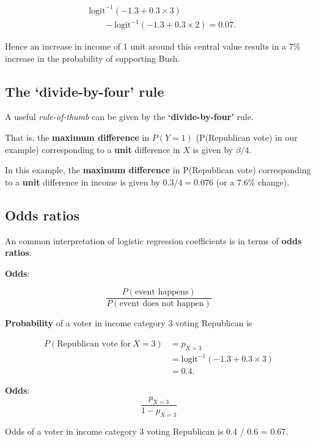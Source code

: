 \documentclass[]{book}
\theoremstyle{definition}
\theoremstyle{definition}
\theoremstyle{definition}
\theoremstyle{remark}
\begin{document}
\[
\begin{aligned}
& \mbox{logit}^{-1}\left(-1.3 + 0.3 \times 3\right) \\
&~~~~~~~~- \mbox{logit}^{-1}\left(-1.3 + 0.3 \times 2\right) = 0.07.
\end{aligned}
\]

Hence an increase in income of 1 unit around this central value results
in a 7\% increase in the probability of supporting Bush.

\subsection{\texorpdfstring{The `divide-by-four'
rule}{The divide-by-four rule}}\label{the-divide-by-four-rule}

A useful \emph{rule-of-thumb} can be given by the
\textbf{`divide-by-four'} rule.

That is, the \textbf{maximum difference} in \(P(Y = 1)\) (P(Republican
vote) in our example) corresponding to a \textbf{unit} difference in
\(X\) is given by \(\beta / 4\).

In this example, the \textbf{maximum difference} in P(Republican vote)
corresponding to a \textbf{unit} difference in income is given by
\(0.3 / 4 = 0.076\) (or a 7.6\% change).

\subsection{Odds ratios}\label{odds-ratios}

An common interpretation of logistic regression coefficients is in terms
of \textbf{odds ratios}.

\textbf{Odds}:

\[
    \frac{P(\mbox{event happens})}{P(\mbox{event does not happen})}
\]

\textbf{Probability} of a voter in income category 3 voting Republican
is

\[
    \begin{aligned}
    P(\mbox{Republican vote for}~X = 3) &= p_{X = 3}\\
    &= \mbox{logit}^{-1}\left(-1.3 + 0.3 \times 3\right)\\
    &= 0.4.
    \end{aligned}
\]

\textbf{Odds}: \[\frac{p_{X = 3}}{1 - p_{X = 3}}\]

Odds of a voter in income category 3 voting Republican is 0.4 / 0.6 =
0.67.
\end{document}
